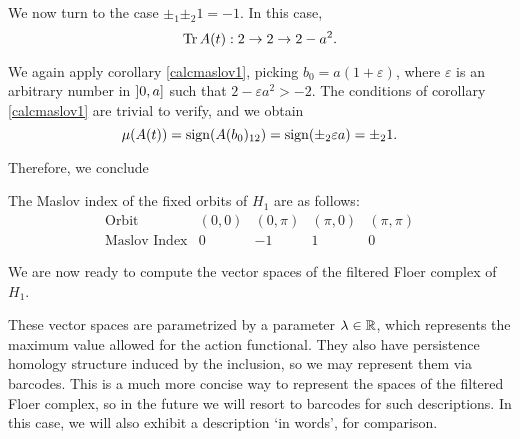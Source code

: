 We now turn to the case $\pm_1 \pm_2 1 = -1$. In this case,
\begin{equation}
\operatorname{Tr} A(t) : 2 \to 2 \to 2 - a^2.
\end{equation}

We again apply corollary \ref{calcmaslov1}, picking $b_0 = a(1 + \varepsilon)$, where $\varepsilon$ is an arbitrary number in $\linterval 0 a$ such that $2 - \varepsilon a^2 > -2$. The conditions of corollary \ref{calcmaslov1} are trivial to verify, and we obtain
\begin{equation}
\mu(A(t)) = \operatorname{sign}(A(b_0)_{12}) = \operatorname{sign}(\pm_2 \varepsilon a) = \pm_2 1.
\end{equation}

Therefore, we conclude
\begin{prop}
The Maslov index of the fixed orbits of $H_1$ are as follows:
\begin{equation}
\begin{array}{c|c|c|c|c}
\text{Orbit} & (0,0) & (0,\pi) & (\pi,0) & (\pi,\pi)\\
\hline
\text{Maslov Index} & 0 & -1 & 1 & 0
\end{array}
\end{equation}
\end{prop}

We are now ready to compute the vector spaces of the filtered Floer complex of $H_1$.

These vector spaces are parametrized by a parameter $\lambda \in \mathbb{R}$, which represents the maximum value allowed for the action functional. They also have persistence homology structure induced by the inclusion, so we may represent them via barcodes. This is a much more concise way to represent the spaces of the filtered Floer complex, so in the future we will resort to barcodes for such descriptions. In this case, we will also exhibit a description `in words', for comparison.

